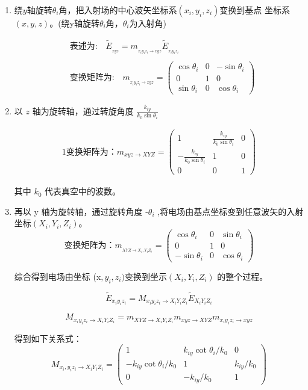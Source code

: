 \documentclass[12pt]{ctexart}
\numberwithin{equation}{section} %
\begin{document}
\begin{enumerate}
    \item 绕$y$轴旋转$\theta_{i}$角，把入射场的中心波矢坐标系$( x_i,y_i,z_i)$变换到基点
    坐标系 $(x,y,z)$。(绕y轴旋转$\theta_{i}$角，$\theta_{i}$为入射角)

    \begin{align*}&\text{表述为:}\quad\tilde{E}_{_{xyz}}=m_{_{x_iy_iz_i\to xyz}}\tilde{E}_{_{x_iy_iz_i}}\\\\&\text{变换矩阵为:}\quad m_{_{x_iy_iz_i\to xyz}}=\begin{pmatrix}\cos\theta_i&0&-\sin\theta_i\\0&1&0\\\sin\theta_i&0&\cos\theta_i\end{pmatrix}\end{align*}
    \item 以 $z$ 轴为旋转轴，通过转旋角度 $\frac{k_{iy}}{k_0 \sin{\theta_i}}$

    \begin{alignat*}{1}
        \text{变换矩阵为：} m_{xyz \to XYZ} = \begin{pmatrix}
            1 & \frac{k_{iy}}{k_{0} \sin \theta_{i}} & 0 \\
            -\frac{k_{iy}}{k_{0} \sin \theta_{i}} & 1 & 0 \\
            0 & 0 & 1
        \end{pmatrix}
    \end{alignat*}
    
    其中 $k_0$ 代表真空中的波数。
    \item 再以 y 轴为旋转轴，通过旋转角度 -$\theta_{i}$ ,将电场由基点坐标变到任意波矢的入射坐标$(X_i,Y_i,Z_i)$。
    $$\text{变换矩阵为：}m_{_{XYZ\to X_i,Y_iZ_i}}=\begin{pmatrix}\cos\theta_i&0&\sin\theta_i\\0&1&0\\-\sin\theta_i&0&\cos\theta_i\end{pmatrix}$$


综合得到电场由坐标 (x$,y_i,z_i)$变换到坐示$( X_{i}, Y_{i}, Z_{i})$ 的整个过程。

$$\tilde{E}_{x_iy_iz_i}=M_{x_iy_iz_i\to X_iY_iZ_i}\tilde{E}_{X_iY_iZ_i}$$

$$M_{x_iy_iz_i\to X_iY_iZ_i}=m_{XYZ\to X_iY_iZ_i}m_{xyz\to XYZ}m_{x_iy_iz_i\to xyz}$$

得到如下关系式：
$$M_{x_i,y_iz_i\to X_iY_iZ_i}=\begin{pmatrix}1&k_{iy}\cot\theta_i/k_0&0\\-k_{iy}\cot\theta_i/k_0&1&k_{iy}/k_0\\0&-k_{iy}/k_0&1\end{pmatrix}$$


\end{enumerate}
\end{document}
